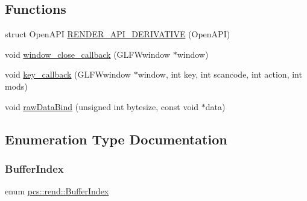 \subsection*{Functions}
\begin{DoxyCompactItemize}
\item 
struct Open\+A\+PI \hyperlink{namespacepcs_1_1rend_a47b6c0b1a163b77ece37e062069e9a53}{R\+E\+N\+D\+E\+R\+\_\+\+A\+P\+I\+\_\+\+D\+E\+R\+I\+V\+A\+T\+I\+VE} (Open\+A\+PI)
\item 
void \hyperlink{namespacepcs_1_1rend_a1503c4309f7b12b21e81ea63bd94d2aa}{window\+\_\+close\+\_\+callback} (G\+L\+F\+Wwindow $\ast$window)
\item 
void \hyperlink{namespacepcs_1_1rend_a8e7a766672350b75533bef4c5191ae4d}{key\+\_\+callback} (G\+L\+F\+Wwindow $\ast$window, int key, int scancode, int action, int mods)
\item 
void \hyperlink{namespacepcs_1_1rend_ac79ddac7e283a8b63b72499a84603863}{raw\+Data\+Bind} (unsigned int bytesize, const void $\ast$data)
\end{DoxyCompactItemize}


\subsection{Enumeration Type Documentation}
\mbox{\label{namespacepcs_1_1rend_a731e43a479c7b7b61dd23586494ee61b}} 
\subsubsection{\texorpdfstring{Buffer\+Index}{BufferIndex}}
{\footnotesize\ttfamily enum \hyperlink{namespacepcs_1_1rend_a731e43a479c7b7b61dd23586494ee61b}{pcs\+::rend\+::\+Buffer\+Index}\hspace{0.3cm}{\ttfamily [strong]}}

